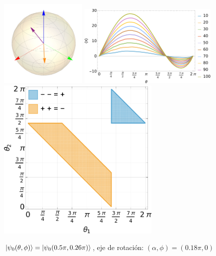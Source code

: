 \documentclass[11pt,letterpaper,twocolumn]{article} %
\begin{document}
\begin{figure}
\centering
\includegraphics[width=0.37\textwidth]{figs/fixed_rotation_axes_bloch_sphere_01.pdf}
\includegraphics[width=0.6\textwidth]{figs/fixed_rotation_axes_expval_01.pdf}
\includegraphics[width=0.7\textwidth]{figs/fixed_rotation_axes_01.pdf}
\caption{$\ket{\psi_0(\theta,\phi)} = \ket{\psi_0(0.5\pi, 0.26\pi)}$, 
eje de rotación: $(\alpha, \phi) = (0.18\pi, 0)$}
\end{figure}

% 



\end{document}
